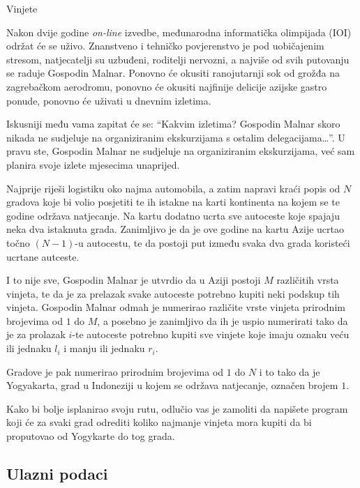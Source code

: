 \begin{statement}[
  problempoints=100,
  timelimit=3 sekunde,
  memorylimit=512 MiB,
]{Vinjete}

Nakon dvije godine \textit{on-line} izvedbe, međunarodna informatička
olimpijada (IOI) održat će se uživo. Znanstveno i tehničko povjerenstvo je
pod uobičajenim stresom, natjecatelji su uzbuđeni, roditelji nervozni, a
najviše od svih putovanju se raduje Gospodin Malnar. Ponovno će okusiti
ranojutarnji sok od grožđa na zagrebačkom aerodromu, ponovno će okusiti
najfinije delicije azijske gastro ponude, ponovno će uživati u dnevnim
izletima.

Iskusniji među vama zapitat će se: ``Kakvim izletima? Gospodin Malnar skoro
nikada ne sudjeluje na organiziranim ekskurzijama s ostalim delegacijama\ldots''.
U pravu ste, Gospodin Malnar ne sudjeluje na organiziranim ekskurzijama, već sam
planira svoje izlete mjesecima unaprijed.

Najprije riješi logistiku oko najma automobila, a zatim napravi kraći popis od
$N$ gradova koje bi volio posjetiti te ih istakne na karti kontinenta na
kojem se te godine održava natjecanje. Na kartu dodatno ucrta sve autoceste
koje spajaju neka dva istaknuta grada. Zanimljivo je da je ove godine na
kartu Azije ucrtao točno $(N-1)$-u autocestu, te da postoji put između svaka
dva grada koristeći ucrtane autceste.

I to nije sve, Gospodin Malnar je utvrdio da u Aziji postoji $M$ različitih
vrsta vinjeta, te da je za prelazak svake autoceste potrebno kupiti neki
podskup tih vinjeta. Gospodin Malnar odmah je numerirao različite vrste
vinjeta prirodnim brojevima od $1$ do $M$, a posebno je zanimljivo da ih je
uspio numerirati tako da je za prolazak $i$-te autoceste potrebno kupiti sve
vinjete koje imaju oznaku veću ili jednaku $l_i$ i manju ili jednaku $r_i$.

Gradove je pak numerirao prirodnim brojevima od $1$ do $N$ i to tako da je
Yogyakarta, grad u Indoneziji u kojem se održava natjecanje, označen brojem $1$.

Kako bi bolje isplanirao svoju rutu, odlučio vas je zamoliti da napišete program
koji će za svaki grad odrediti koliko najmanje vinjeta mora kupiti da bi
proputovao od Yogykarte do tog grada.
\subsection*{Ulazni podaci}


\end{statement}
